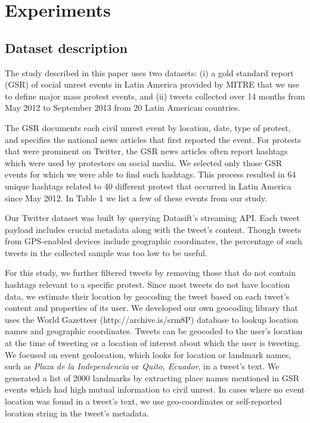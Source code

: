 
\section{Experiments}
\subsection{Dataset description}

The study described in this paper uses two datasets: (i)
a gold standard report (GSR) of social unrest events in Latin America
provided by MITRE that we use to define
major mass protest events, and (ii)
tweets collected over 14 months from May 2012 to September 2013 from 20
Latin American countries.

The GSR documents each civil unrest event by location, date, type
of protest, and specifies the national news articles that
first reported the event. For protests that were prominent on Twitter, the
GSR news articles often report hashtags which were used by protestors
on social media. We selected only those GSR events for which we
were able to find such hashtags. This process resulted in 64
unique hashtags related to 40 different protest that occurred
in Latin America since May 2012. In Table 1 we list a few of
these events from our study.

Our Twitter dataset was built by querying Datasift's streaming API. Each tweet payload includes crucial metadata along with the tweet's content. Though tweets from GPS-enabled devices include geographic coordinates, the percentage of such tweets in the collected sample was too low to be useful.

For this study, we further filtered tweets by removing those that do not contain hashtags relevant to a specific protest. Since most tweets do not have location data, we estimate their location by geocoding the tweet based on each tweet's content and properties of its user. We developed our own geocoding library that uses the World Gazetteer (http://archive.is/srm8P) database to lookup location names and geographic coordinates. Tweets can be geocoded to the user's location at the time of tweeting or a location of interest about which the user is tweeting. We focused on event geolocation, which looks for location or landmark names, such as \textit{Plaza de la Independencia} or \textit{Quito, Ecuador}, in a tweet's text.  We generated a list of 2000 landmarks by extracting place names mentioned in GSR events which had high mutual information to civil unrest. In cases where no event location was found in a tweet's text, we use geo-coordinates or self-reported location string in the tweet's metadata.


